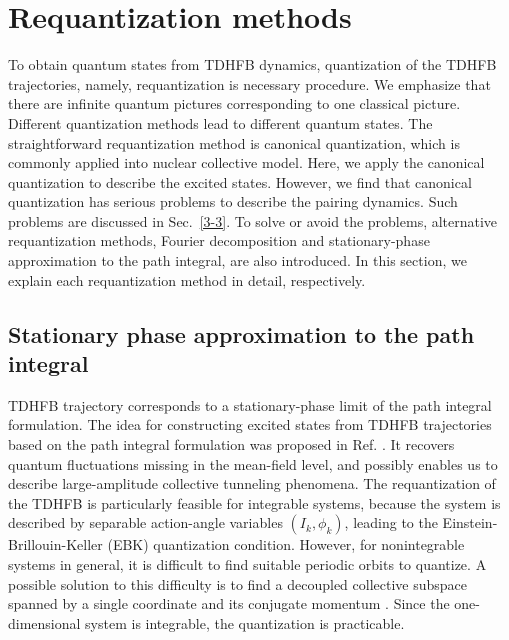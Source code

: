 \documentclass[11pt]{book} %
\begin{document}
\section{Requantization methods}
\label{3-2}
To obtain quantum states from TDHFB dynamics, quantization of the TDHFB trajectories, namely, requantization is necessary procedure. We emphasize that there are infinite quantum pictures corresponding to one classical picture. Different quantization methods lead to different quantum states. The straightforward requantization method is canonical quantization, which is commonly applied into nuclear collective model. Here, we apply the canonical quantization to describe the excited states. However, we find that canonical quantization has serious problems to describe the pairing dynamics. Such problems are discussed in Sec.~\ref{3-3}. To solve or avoid the problems, alternative requantization methods, Fourier decomposition and stationary-phase approximation to the path integral, are also introduced. In this section, we explain each requantization method in detail, respectively.

\subsection{Stationary phase approximation to the path integral}
TDHFB trajectory corresponds to a stationary-phase limit of the path integral formulation. The idea for constructing excited states from TDHFB trajectories based on the path integral formulation was proposed in Ref. \cite{Neg82,L80,LNP80,KS80,K81,Rei80}. 
It recovers quantum fluctuations missing in the mean-field
level, and possibly enables us to describe large-amplitude collective
tunneling phenomena.
The requantization of the TDHFB is particularly feasible
for integrable systems, because the system is described by separable
action-angle variables $(I_k, \phi_k)$, leading to
the Einstein-Brillouin-Keller (EBK) quantization condition.
However, for nonintegrable systems in general, it is difficult to find
suitable periodic orbits to quantize.
A possible solution to this difficulty is to find a decoupled collective
subspace spanned by
a single coordinate and its conjugate momentum \cite{NMMY16}.
Since the one-dimensional system is integrable, the quantization is
practicable.
\end{document}
